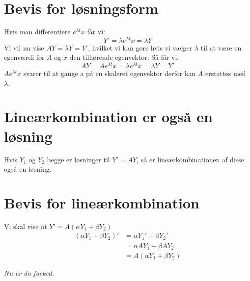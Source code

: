 \documentclass[a4paper,oneside,article]{memoir}
\begin{document}
	\section{Bevis for løsningsform}
	Hvis man differentiere $e^{\lambda t}x$ får vi:
	$$Y'=\lambda e^{\lambda t}x=\lambda Y$$
	Vi vil nu vise $AY=\lambda Y=Y'$, hvilket vi
	kan gøre hvis vi vælger $\lambda$ til at være en
	egenværdi for $A$ og $x$ den tilhørende egenvektor.
	Så får vi:
	$$AY=Ae^{\lambda t}x=\lambda e^{\lambda t}x = \lambda Y = Y'$$
	$A e^{\lambda t}x$ svarer til at gange a på en
	skaleret egenvektor derfor kan $A$ erstattes
	med $\lambda$.
	
	\section{Lineærkombination er også en løsning}
	Hvis $Y_1$ og $Y_2$ begge er løsninger til $Y'=AY$, så er
	lineærkombinationen af disse også en løsning.
	
	\section{Bevis for lineærkombination}
	Vi skal vise at $Y'=A(\alpha Y_1+ \beta Y_2)$
	\begin{align*}
	(\alpha Y_1 + \beta Y_2)' &= \alpha Y_1'+ \beta Y_2'\\
	&= \alpha A Y_1+\beta AY_2\\
	&=A(\alpha Y_1 + \beta Y_2)
	\end{align*}
	
	\textit{Nu er du fucked.}
\end{document}
